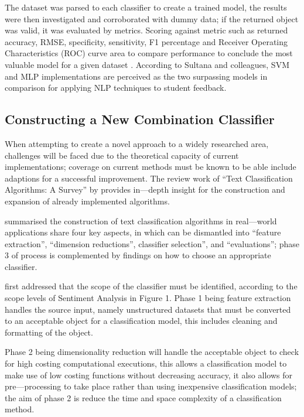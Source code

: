 The dataset was parsed to each classifier to create a trained model, the results were then investigated and corroborated with dummy data; if the returned object was valid, it was evaluated by metrics. Scoring against metric such as returned accuracy, RMSE, specificity, sensitivity, F1 percentage and Receiver Operating Characteristics (ROC) curve area to compare performance to conclude the most valuable model for a given dataset \parencite{sultana2018prediction}. According to Sultana and colleagues, SVM and MLP implementations are perceived as the two surpassing models in comparison for applying NLP techniques to student feedback.

\subsection{Constructing a New Combination Classifier}

When attempting to create a novel approach to a widely researched area, challenges will be faced due to the theoretical capacity of current implementations; coverage on current methods must be known to be able include adaptions for a successful improvement. The review work of “Text Classification Algorithms: A Survey” by \parencite{kowsari2019text} provides in---depth insight for the construction and expansion of already implemented algorithms.

\textcite{kowsari2019text} summarised the construction of text classification algorithms in real---world applications share four key aspects, in which can be dismantled into “feature extraction”, “dimension reductions”, classifier selection”, and “evaluations”; phase 3 of \textcite{kowsari2019text} process is complemented by \textcite{enriquez2013comparative} findings on how to choose an appropriate classifier.

\textcite{kowsari2019text} first addressed that the scope of the classifier must be identified, according to the scope levels of Sentiment Analysis in Figure 1. Phase 1 being feature extraction handles the source input, namely unstructured datasets that must be converted to an acceptable object for a classification model, this includes cleaning and formatting of the object.

Phase 2 being dimensionality reduction will handle the acceptable object to check for high costing computational executions, this allows a classification model to make use of low costing functions without decreasing accuracy, it also allows for pre---processing to take place rather than using inexpensive classification models; the aim of phase 2 is reduce the time and space complexity of a classification method.

